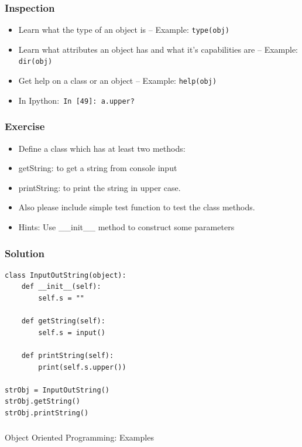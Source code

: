 \begin{frame}[fragile] \frametitle{Inspection}
\begin{itemize}
\item  Learn what the type of an object is -- Example:  \lstinline|type(obj)|
\item Learn what attributes an object has and what it's capabilities are -- Example: \lstinline|dir(obj)|
\item Get help on a class or an object -- Example:  \lstinline|help(obj)|
\item In Ipython:\lstinline| In [49]: a.upper?|
\end{itemize}
\end{frame}


\begin{frame}[fragile]\frametitle{Exercise}
\begin{itemize}
\item Define a class which has at least two methods:
\item getString: to get a string from console input
\item printString: to print the string in upper case.
\item Also please include simple test function to test the class methods.
\item Hints: Use \_\_init\_\_ method to construct some parameters
\end{itemize}
\end{frame}

\begin{frame}[fragile]\frametitle{Solution}
\begin{lstlisting}
class InputOutString(object):
    def __init__(self):
        self.s = ""

    def getString(self):
        self.s = input()

    def printString(self):
        print(self.s.upper())

strObj = InputOutString()
strObj.getString()
strObj.printString()
\end{lstlisting}
\end{frame}

\begin{frame}[fragile]\frametitle{}
\begin{center}
{\Large Object Oriented Programming: Examples}
\end{center}
\end{frame}


